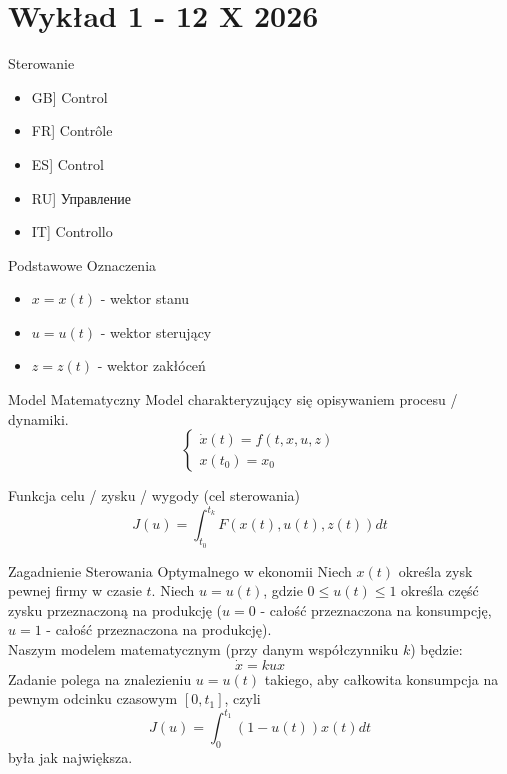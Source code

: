 \chapter{Wykład 1 - 12 X 2026}

\newcommand{\listflag}[1]{\worldflag[length=0.8cm, width=0.5cm]{#1}}
\newcommand{\ru}[1]{\foreignlanguage{russian}{\fontfamily{cmtt}\selectfont #1}}

\begin{funfact}{Sterowanie}{}{}
    \begin{itemize}[label={}]
        \item[\listflag{GB}] Control
        \item[\listflag{FR}] Contrôle
        \item[\listflag{ES}] Control
        \item[\listflag{RU}] \ru{Управление}
        \item[\listflag{IT}] Controllo
    \end{itemize}
\end{funfact}

\begin{definition}{Podstawowe Oznaczenia}{}{}
    \begin{itemize}
        \item $x = x(t)$ - wektor stanu
        \item $u = u(t)$ - wektor sterujący
        \item $z = z(t)$ - wektor zakłóceń
    \end{itemize}
\end{definition}

\begin{definition}{Model Matematyczny}{}{}
    Model charakteryzujący się opisywaniem procesu / dynamiki.
    \[
    \begin{cases}
        \dot{x}(t) = f(t, x, u, z) \\
        x(t_0) = x_0
    \end{cases}
    \]
\end{definition}

\begin{definition}{Funkcja celu / zysku / wygody (cel sterowania)}{}{}
    $$J(u) = \int_{t_0}^{t_k} F(x(t), u(t), z(t)) dt$$
\end{definition}

\begin{example}{Zagadnienie Sterowania Optymalnego w ekonomii}{}{}
    Niech $x(t)$ określa zysk pewnej firmy w czasie $t$. Niech $u = u(t)$, gdzie $0 \leq u(t) \leq 1$ określa część zysku przeznaczoną na produkcję ($u = 0$ - całość przeznaczona na konsumpcję, $u = 1$ - całość przeznaczona na produkcję). \\
    Naszym modelem matematycznym (przy danym współczynniku $k$) będzie: $$\dot{x} = k u x$$
    Zadanie polega na znalezieniu $u = u(t)$ takiego, aby całkowita konsumpcja na pewnym odcinku czasowym $[0, t_1]$, czyli $$J(u) = \int^{t_1}_0 (1 - u(t)) x(t) dt$$
    była jak największa.
\end{example}

